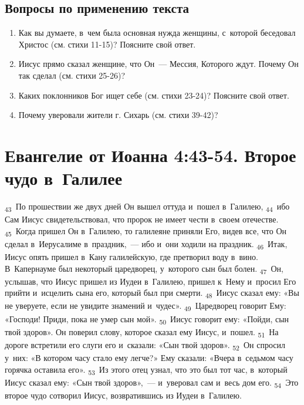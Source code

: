 \documentclass[a4paper,12pt]{article}
\begin{document}
\subsection*{Вопросы по применению текста} 
\begin{enumerate}
    \item Как вы думаете, в~чем была основная нужда женщины, с~которой беседовал Христос (см. стихи 11-15)? Поясните свой ответ. 
    
    \myline
    
    \myline
    \item Иисус прямо сказал женщине, что Он~--- Мессия, Которого ждут. Почему Он так сделал (см. стихи 25-26)? 
    
    \myline
    
    \myline
    \item Каких поклонников Бог ищет себе (см. стихи 23-24)? Поясните свой ответ. 
    
    \myline
    
    \myline
    \item Почему уверовали жители г. Сихарь (см. стихи 39-42)? 
    
    \myline
    
    \myline
\end{enumerate}



\section{Евангелие от Иоанна 4:43-54. Второе чудо в~Галилее}

 \textsubscript{43}~По прошествии же двух дней Он вышел оттуда и~пошел в~Галилею, \textsubscript{44}~ибо Сам Иисус свидетельствовал, что пророк не имеет чести в~своем отечестве. \textsubscript{45}~Когда пришел Он в~Галилею, то галилеяне приняли Его, видев все, что Он сделал в~Иерусалиме в~праздник,~--- ибо и~они ходили на праздник. \textsubscript{46}~Итак, Иисус опять пришел в~Кану галилейскую, где претворил воду в~вино. В~Капернауме был некоторый царедворец, у~которого сын был болен. \textsubscript{47}~Он, услышав, что Иисус пришел из Иудеи в~Галилею, пришел к~Нему и~просил Его прийти и~исцелить сына его, который был при смерти. \textsubscript{48}~Иисус сказал ему: «Вы не уверуете, если не увидите знамений и~чудес». \textsubscript{49}~Царедворец говорит Ему: «Господи! Приди, пока не умер сын мой». \textsubscript{50}~Иисус говорит ему: «Пойди, сын твой здоров». Он поверил слову, которое сказал ему Иисус, и~пошел. \textsubscript{51}~На дороге встретили его слуги его и~сказали: «Сын твой здоров». \textsubscript{52}~Он спросил у~них: «В котором часу стало ему легче?» Ему сказали: «Вчера в~седьмом часу горячка оставила его». \textsubscript{53}~Из этого отец узнал, что это был тот час, в~который Иисус сказал ему: «Сын твой здоров»,~--- и~уверовал сам и~весь дом его. \textsubscript{54}~Это второе чудо сотворил Иисус, возвратившись из Иудеи в~Галилею. 
\end{document}
